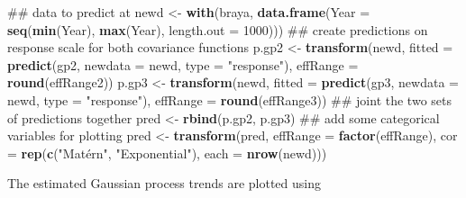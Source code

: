 \documentclass[12pt,]{article}
\newenvironment{Shaded}{\begin{snugshade}}{\end{snugshade}}
\newcommand{\KeywordTok}[1]{\textcolor[rgb]{0.13,0.29,0.53}{\textbf{{#1}}}}
\newcommand{\DataTypeTok}[1]{\textcolor[rgb]{0.13,0.29,0.53}{{#1}}}
\newcommand{\DecValTok}[1]{\textcolor[rgb]{0.00,0.00,0.81}{{#1}}}
\newcommand{\StringTok}[1]{\textcolor[rgb]{0.31,0.60,0.02}{{#1}}}
\newcommand{\OtherTok}[1]{\textcolor[rgb]{0.56,0.35,0.01}{{#1}}}
\newcommand{\NormalTok}[1]{{#1}}
\begin{document}
\begin{Shaded}
\begin{Highlighting}[]
\NormalTok{## data to predict at}
\NormalTok{newd <-}\StringTok{ }\KeywordTok{with}\NormalTok{(braya, }\KeywordTok{data.frame}\NormalTok{(}\DataTypeTok{Year =} \KeywordTok{seq}\NormalTok{(}\KeywordTok{min}\NormalTok{(Year), }\KeywordTok{max}\NormalTok{(Year),}
                               \DataTypeTok{length.out =} \DecValTok{1000}\NormalTok{)))}
\NormalTok{## create predictions on response scale for both covariance functions}
\NormalTok{p.gp2 <-}\StringTok{ }\KeywordTok{transform}\NormalTok{(newd,}
                   \DataTypeTok{fitted =} \KeywordTok{predict}\NormalTok{(gp2, }\DataTypeTok{newdata =} \NormalTok{newd, }\DataTypeTok{type =} \StringTok{"response"}\NormalTok{),}
                   \DataTypeTok{effRange =} \KeywordTok{round}\NormalTok{(effRange2))}
\NormalTok{p.gp3 <-}\StringTok{ }\KeywordTok{transform}\NormalTok{(newd,}
                   \DataTypeTok{fitted =} \KeywordTok{predict}\NormalTok{(gp3, }\DataTypeTok{newdata =} \NormalTok{newd, }\DataTypeTok{type =} \StringTok{"response"}\NormalTok{),}
                   \DataTypeTok{effRange =} \KeywordTok{round}\NormalTok{(effRange3))}
\NormalTok{## joint the two sets of predictions together}
\NormalTok{pred <-}\StringTok{ }\KeywordTok{rbind}\NormalTok{(p.gp2, p.gp3)}
\NormalTok{## add some categorical variables for plotting}
\NormalTok{pred <-}\StringTok{ }\KeywordTok{transform}\NormalTok{(pred,}
                  \DataTypeTok{effRange =} \KeywordTok{factor}\NormalTok{(effRange),}
                  \DataTypeTok{cor =} \KeywordTok{rep}\NormalTok{(}\KeywordTok{c}\NormalTok{(}\StringTok{"Matérn"}\NormalTok{, }\StringTok{"Exponential"}\NormalTok{), }\DataTypeTok{each =} \KeywordTok{nrow}\NormalTok{(newd)))}
\end{Highlighting}
\end{Shaded}

The estimated Gaussian process trends are plotted using

\begin{Shaded}
\end{Shaded}
\end{document}
